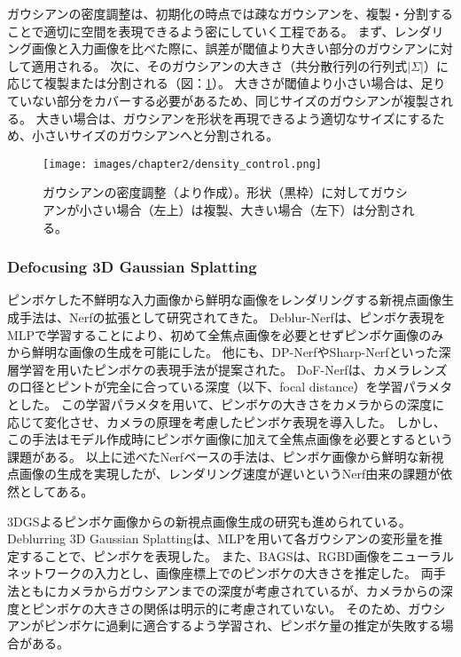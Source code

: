 ガウシアンの密度調整は、初期化の時点では疎なガウシアンを、複製・分割することで適切に空間を表現できるよう密にしていく工程である。
まず、レンダリング画像と入力画像を比べた際に、誤差が閾値より大きい部分のガウシアンに対して適用される。
次に、そのガウシアンの大きさ（共分散行列の行列式$|\Sigma|$）に応じて複製または分割される（図：\ref{fig:density_control}）。
大きさが閾値より小さい場合は、足りていない部分をカバーする必要があるため、同じサイズのガウシアンが複製される。
大きい場合は、ガウシアンを形状を再現できるよう適切なサイズにするため、小さいサイズのガウシアンへと分割される。

\begin{figure}[h]
    \centering
    \texttt{[image: images/chapter2/density\_control.png]}
    \caption[ガウシアンの密度調整]{ガウシアンの密度調整（\cite{3dgs}より作成）。形状（黒枠）に対してガウシアンが小さい場合（左上）は複製、大きい場合（左下）は分割される。}
    \label{fig:density_control}
\end{figure}

\subsubsection{Defocusing 3D Gaussian Splatting}\label{subsec:defocusing_3dgs}
ピンボケした不鮮明な入力画像から鮮明な画像をレンダリングする新視点画像生成手法は、Nerfの拡張として研究されてきた。
Deblur-Nerf\cite{deblur-nerf}は、ピンボケ表現をMLPで学習することにより、初めて全焦点画像を必要とせずピンボケ画像のみから鮮明な画像の生成を可能にした。
他にも、DP-Nerf\cite{dp-nerf}やSharp-Nerf\cite{sharp-nerf}といった深層学習を用いたピンボケの表現手法が提案された。
DoF-Nerf\cite{dof-nerf}は、カメラレンズの口径とピントが完全に合っている深度（以下、focal distance）を学習パラメタとした。
この学習パラメタを用いて、ピンボケの大きさをカメラからの深度に応じて変化させ、カメラの原理を考慮したピンボケ表現を導入した。
しかし、この手法はモデル作成時にピンボケ画像に加えて全焦点画像を必要とするという課題がある。
以上に述べたNerfベースの手法は、ピンボケ画像から鮮明な新視点画像の生成を実現したが、レンダリング速度が遅いというNerf由来の課題が依然としてある。\par

3DGSよるピンボケ画像からの新視点画像生成の研究も進められている。
Deblurring 3D Gaussian Splatting\cite{Deblurring3dgs}は、MLPを用いて各ガウシアンの変形量を推定することで、ピンボケを表現した。
また、BAGS\cite{BAGS}は、RGBD画像をニューラルネットワークの入力とし、画像座標上でのピンボケの大きさを推定した。
両手法ともにカメラからガウシアンまでの深度が考慮されているが、カメラからの深度とピンボケの大きさの関係は明示的に考慮されていない。
そのため、ガウシアンがピンボケに過剰に適合するよう学習され、ピンボケ量の推定が失敗する場合がある。

